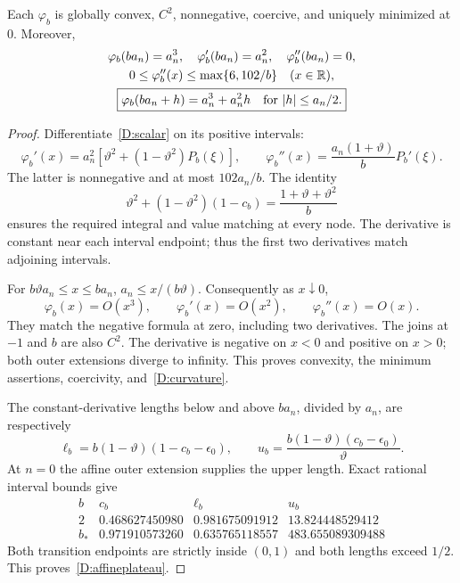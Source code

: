 \begin{lemma}\label{D:scalarlemma}
Each $\varphi_b$ is globally convex, $C^2$, nonnegative, coercive, and uniquely minimized at $0$. Moreover,
\begin{gather}
 \varphi_b(ba_n)=a_n^3,\quad
 \varphi_b'(ba_n)=a_n^2,\quad\varphi_b''(ba_n)=0,\label{D:jets}\\
 0\le\varphi_b''(x)\le\max\{6,102/b\}\quad(x\in\mathbb R),\label{D:curvature}\\
 \boxed{\varphi_b(ba_n+h)=a_n^3+a_n^2h\quad\text{for }|h|\le a_n/2.}\label{D:affineplateau}
\end{gather}
\end{lemma}
\begin{proof}
Differentiate~\eqref{D:scalar} on its positive intervals:
\[
 \varphi_b'(x)=a_n^2[\vartheta^2+(1-\vartheta^2)P_b(\xi)],
 \qquad
 \varphi_b''(x)=\frac{a_n(1+\vartheta)}bP_b'(\xi).
\]
The latter is nonnegative and at most $102a_n/b$. The identity
\[
 \vartheta^2+(1-\vartheta^2)(1-c_b)
 =\frac{1+\vartheta+\vartheta^2}{b}
\]
ensures the required integral and value matching at every node. The derivative is constant near each interval endpoint; thus the first two derivatives match adjoining intervals.

For $b\vartheta a_n\le x\le ba_n$, $a_n\le x/(b\vartheta)$. Consequently as $x\downarrow0$,
\[
 \varphi_b(x)=O(x^3),\qquad\varphi_b'(x)=O(x^2),\qquad
 \varphi_b''(x)=O(x).
\]
They match the negative formula at zero, including two derivatives. The joins at $-1$ and $b$ are also $C^2$. The derivative is negative on $x<0$ and positive on $x>0$; both outer extensions diverge to infinity. This proves convexity, the minimum assertions, coercivity, and~\eqref{D:curvature}.

The constant-derivative lengths below and above $ba_n$, divided by $a_n$, are respectively
\[
 \ell_b=b(1-\vartheta)(1-c_b-\epsilon_0),\qquad
 u_b=\frac{b(1-\vartheta)(c_b-\epsilon_0)}{\vartheta}.
\]
At $n=0$ the affine outer extension supplies the upper length. Exact rational interval bounds give
\[
\begin{array}{c|ccc}
 b&c_b&\ell_b&u_b\\\hline
2&0.468627450980&0.981675091912&13.824448529412\\
b_*&0.971910573260&0.635765118557&483.655089309488
\end{array}
\]
Both transition endpoints are strictly inside $(0,1)$ and both lengths exceed $1/2$. This proves~\eqref{D:affineplateau}.
\end{proof}

